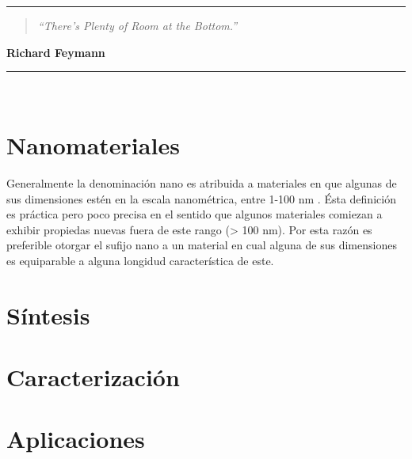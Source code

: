 \noindent
\rule{\linewidth}{1 pt}
\begin{flushright}
	\begin{quotation}
		\small{
			\textit{``There’s Plenty of Room at the Bottom.''}}
	\end{quotation}
	\bf{Richard Feymann}
\end{flushright}
\noindent
\rule{\linewidth}{1 pt}\\
\vfill
\section{Nanomateriales}
Generalmente la denominación nano es atribuida a materiales en que algunas de sus dimensiones estén en la escala nanométrica, entre 1-100 nm \cite{Gressler2013}. Ésta definición es práctica pero poco precisa en el sentido que algunos materiales comiezan a exhibir propiedas nuevas fuera de este rango (> 100 nm). Por esta razón es preferible otorgar el sufijo nano a un material en cual alguna de sus dimensiones es equiparable a alguna longidud característica de este.
\section{Síntesis}

\section{Caracterización}

\section{Aplicaciones}
